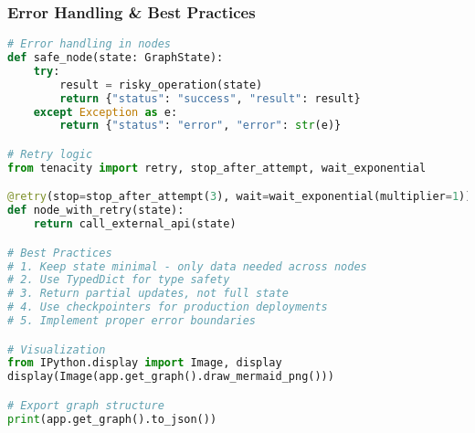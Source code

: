 \begin{frame}[fragile]\frametitle{Error Handling \& Best Practices}
      \begin{lstlisting}[language=python,basicstyle=\tiny]
# Error handling in nodes
def safe_node(state: GraphState):
    try:
        result = risky_operation(state)
        return {"status": "success", "result": result}
    except Exception as e:
        return {"status": "error", "error": str(e)}

# Retry logic
from tenacity import retry, stop_after_attempt, wait_exponential

@retry(stop=stop_after_attempt(3), wait=wait_exponential(multiplier=1))
def node_with_retry(state):
    return call_external_api(state)

# Best Practices
# 1. Keep state minimal - only data needed across nodes
# 2. Use TypedDict for type safety
# 3. Return partial updates, not full state
# 4. Use checkpointers for production deployments
# 5. Implement proper error boundaries

# Visualization
from IPython.display import Image, display
display(Image(app.get_graph().draw_mermaid_png()))

# Export graph structure
print(app.get_graph().to_json())
  \end{lstlisting}
\end{frame}